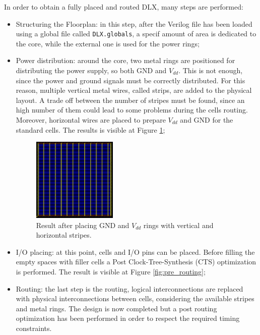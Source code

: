 In order to obtain a fully placed and routed DLX, many steps are performed:
\begin{itemize}
	\item Structuring the Floorplan: in this step, after the Verilog file has been loaded using a global file called \texttt{DLX.globals}, a specif amount of area is dedicated to the core, while the external one is used for the power rings;
	\item Power distribution: around the core, two metal rings are positioned for distributing the power supply, so both GND and $V_{dd}$. This is not enough, since the power and ground signals must be correctly distributed. For this reason, multiple vertical metal wires, called strips, are added to the physical layout. A trade off between the number of stripes must be found, since an high number of them could lead to some problems during the cells routing. Moreover, horizontal wires are placed to prepare $V_{dd}$ and GND for the standard cells. The results is visible at Figure \ref{stripes};
	\begin{figure}[h]   
		\centering
		\includegraphics[width=0.38\textwidth]{chapters/9_PhysicalDesign/images/pwr_distribution.png}
		\caption{Result after placing GND and $V_{dd}$ rings with vertical and horizontal stripes.}
		\label{stripes}
	\end{figure}
	
	\item I/O placing: at this point, cells and I/O pins can be placed. Before filling the empty spaces with filler cells a Post Clock-Tree-Synthesis (CTS) optimization is performed. The result is visible at Figure \ref{fig:pre_routing};
	\item Routing: the last step is the routing, logical interconnections are replaced with physical interconnections between cells, considering the available stripes and metal rings. The design is now completed but a post routing optimization has been performed in order to respect the required timing constraints.
	 
\end{itemize}

